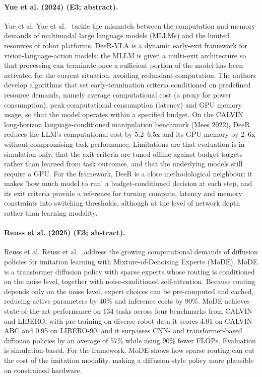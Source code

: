 \documentclass[10pt,a4paper]{article}
\begin{document}
\paragraph{Yue et al. (2024) (E3; abstract).} Yue et al. Yue et al.~\cite{Yue2024} tackle the mismatch between the computation and memory demands of multimodal large language models (MLLMs) and the limited resources of robot platforms. DeeR-VLA is a dynamic early-exit framework for vision-language-action models: the MLLM is given a multi-exit architecture so that processing can terminate once a sufficient portion of the model has been activated for the current situation, avoiding redundant computation. The authors develop algorithms that set early-termination criteria conditioned on predefined resource demands, namely average computational cost (a proxy for power consumption), peak computational consumption (latency) and GPU memory usage, so that the model operates within a specified budget. On the CALVIN long-horizon language-conditioned manipulation benchmark (Mees 2022), DeeR reduces the LLM's computational cost by 5.2--6.5x and its GPU memory by 2--6x without compromising task performance. Limitations are that evaluation is in simulation only, that the exit criteria are tuned offline against budget targets rather than learned from task outcomes, and that the underlying models still require a GPU. For the framework, DeeR is a close methodological neighbour: it makes 'how much model to run' a budget-conditioned decision at each step, and its exit criteria provide a reference for turning compute, latency and memory constraints into switching thresholds, although at the level of network depth rather than learning modality.

\paragraph{Reuss et al. (2025) (E3; abstract).} Reuss et al. Reuss et al.~\cite{Reuss2025} address the growing computational demands of diffusion policies for imitation learning with Mixture-of-Denoising Experts (MoDE). MoDE is a transformer diffusion policy with sparse experts whose routing is conditioned on the noise level, together with noise-conditioned self-attention. Because routing depends only on the noise level, expert choices can be pre-computed and cached, reducing active parameters by 40\% and inference costs by 90\%. MoDE achieves state-of-the-art performance on 134 tasks across four benchmarks from CALVIN and LIBERO; with pre-training on diverse robot data it scores 4.01 on CALVIN ABC and 0.95 on LIBERO-90, and it surpasses CNN- and transformer-based diffusion policies by an average of 57\% while using 90\% fewer FLOPs. Evaluation is simulation-based. For the framework, MoDE shows how sparse routing can cut the cost of the imitation modality, making a diffusion-style policy more plausible on constrained hardware.
\end{document}
